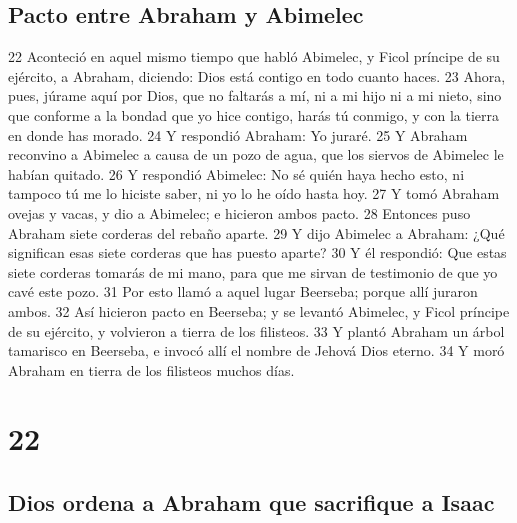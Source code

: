 \section*{Pacto entre Abraham y Abimelec}

22 Aconteció en aquel mismo tiempo que habló Abimelec, y Ficol príncipe de su ejército, a Abraham, diciendo: Dios está contigo en todo cuanto haces.
23 Ahora, pues, júrame aquí por Dios, que no faltarás a mí, ni a mi hijo ni a mi nieto, sino que conforme a la bondad que yo hice contigo, harás tú conmigo, y con la tierra en donde has morado.
24 Y respondió Abraham: Yo juraré.
25 Y Abraham reconvino a Abimelec a causa de un pozo de agua, que los siervos de Abimelec le habían quitado.
26 Y respondió Abimelec: No sé quién haya hecho esto, ni tampoco tú me lo hiciste saber, ni yo lo he oído hasta hoy.
27 Y tomó Abraham ovejas y vacas, y dio a Abimelec; e hicieron ambos pacto.
28 Entonces puso Abraham siete corderas del rebaño aparte.
29 Y dijo Abimelec a Abraham: ¿Qué significan esas siete corderas que has puesto aparte?
30 Y él respondió: Que estas siete corderas tomarás de mi mano, para que me sirvan de testimonio de que yo cavé este pozo.
31 Por esto llamó a aquel lugar Beerseba; porque allí juraron ambos.
32 Así hicieron pacto en Beerseba; y se levantó Abimelec, y Ficol príncipe de su ejército, y volvieron a tierra de los filisteos.
33 Y plantó Abraham un árbol tamarisco en Beerseba, e invocó allí el nombre de Jehová Dios eterno.
34 Y moró Abraham en tierra de los filisteos muchos días.

\chapter{22}

\section*{Dios ordena a Abraham que sacrifique a Isaac}

